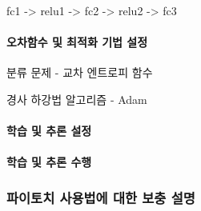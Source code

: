 \documentclass[]{article}
\let\oldparagraph\paragraph
\renewcommand{\paragraph}[1]{\oldparagraph{#1}\mbox{}}
\begin{document}
fc1 -\textgreater{} relu1 -\textgreater{} fc2 -\textgreater{} relu2
-\textgreater{} fc3

\hypertarget{header-n169}{%
\paragraph{오차함수 및 최적화 기법 설정}\label{header-n169}}

분류 문제 - 교차 엔트로피 함수

경사 하강법 알고리즘 - Adam

\hypertarget{header-n172}{%
\paragraph{학습 및 추론 설정}\label{header-n172}}

\hypertarget{header-n173}{%
\paragraph{학습 및 추론 수행}\label{header-n173}}

\hypertarget{header-n175}{%
\subsubsection{파이토치 사용법에 대한 보충 설명}\label{header-n175}}
\end{document}
